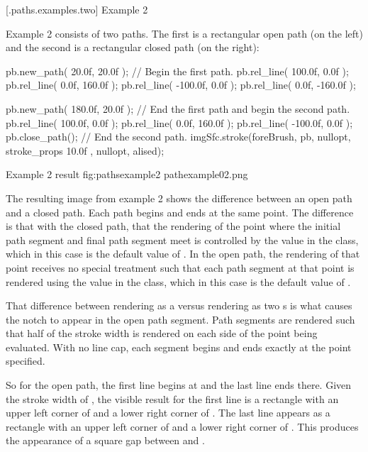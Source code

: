 \FloatBarrier

 [\iotwod.paths.examples.two] {Example 2}

\pnum
Example 2 consists of two paths. The first is a rectangular open path (on the left) and the second is a rectangular closed path (on the right):

\begin{codeblock}
  pb.new_path({ 20.0f, 20.0f }); // Begin the first path.
  pb.rel_line({ 100.0f, 0.0f });
  pb.rel_line({ 0.0f, 160.0f });
  pb.rel_line({ -100.0f, 0.0f });
  pb.rel_line({ 0.0f, -160.0f });
  
  pb.new_path({ 180.0f, 20.0f }); // End the first path and begin the second path.
  pb.rel_line({ 100.0f, 0.0f });
  pb.rel_line({ 0.0f, 160.0f });
  pb.rel_line({ -100.0f, 0.0f });
  pb.close_path(); // End the second path.
  imgSfc.stroke(foreBrush, pb, nullopt, stroke_props{ 10.0f }, nullopt, alised);
\end{codeblock}

\begin{importgraphiciotwod}
{Example 2 result}
{fig:pathsexample2}
{pathexample02.png}
\end{importgraphiciotwod}

\FloatBarrier

\pnum
The resulting image from example 2 shows the difference between an open path and a closed path. Each path begins and ends at the same point. The difference is that with the closed path, that the rendering of the point where the initial path segment and final path segment meet is controlled by the  value in the  class, which in this case is the default value of . In the open path, the rendering of that point receives no special treatment such that each path segment at that point is rendered using the  value in the  class, which in this case is the default value of .

\pnum
That difference between rendering as a  versus rendering as two s is what causes the notch to appear in the open path segment. Path segments are rendered such that half of the stroke width is rendered on each side of the point being evaluated. With no line cap, each segment begins and ends exactly at the point specified.

\pnum
So for the open path, the first line begins at  and the last line ends there. Given the stroke width of , the visible result for the first line is a rectangle with an upper left corner of  and a lower right corner of . The last line appears as a rectangle with an upper left corner of  and a lower right corner of . This produces the appearance of a square gap between  and .

